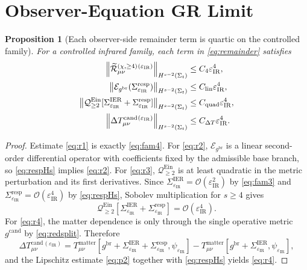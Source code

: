\documentclass[11pt]{article}
\newcommand{\ObserverMetric}{g^{\mathrm{br}}}
\newcommand{\CandidateMetric}{g^{\mathrm{cand}}}
\newcommand{\BaseShift}{\Sigma^{\mathrm{IER}}}
\newcommand{\ResponseShift}{\Sigma^{\mathrm{resp}}}
\newcommand{\EinLin}{\mathcal E_{\ObserverMetric}}
\newcommand{\EinQuad}{\mathcal Q_{\ge 2}^{\mathrm{Ein}}}
\newcommand{\RemLongFour}{\widetilde{\mathcal R}_{\mu\nu}^{(\chi,\ge 4)}}
\newcommand{\DeltaTCand}{\Delta T_{\mu\nu}^{\mathrm{cand}}}
\newcommand{\IRsmall}{\varepsilon_{\mathrm{IR}}}
\newtheorem{proposition}{Proposition}
\begin{document}
\section{Observer-Equation GR Limit}

\begin{proposition}[Each observer-side remainder term is quartic on the controlled family]
\label{prop:quartic}
For a controlled infrared family, each term in \eqref{eq:remainder} satisfies
\begin{align}
\norm{\RemLongFour{}^{(\IRsmall)}}_{H^{s-2}(\Sigma_t)}
&\le
C_4\IRsmall^4,
\label{eq:r1}
\\
\norm{\EinLin(\ResponseShift_{\IRsmall})}_{H^{s-2}(\Sigma_t)}
&\le
C_{\mathrm{lin}}\IRsmall^4,
\label{eq:r2}
\\
\norm{\EinQuad[\BaseShift_{\IRsmall}+\ResponseShift_{\IRsmall}]}_{H^{s-2}(\Sigma_t)}
&\le
C_{\mathrm{quad}}\IRsmall^4,
\label{eq:r3}
\\
\norm{\DeltaTCand{}^{(\IRsmall)}}_{H^{s-2}(\Sigma_t)}
&\le
C_{\Delta T}\IRsmall^4.
\label{eq:r4}
\end{align}
\end{proposition}

\begin{proof}
Estimate \eqref{eq:r1} is exactly \eqref{eq:fam4}. For \eqref{eq:r2}, \(\EinLin\) is a linear second-order differential operator with coefficients fixed by the admissible base branch, so \eqref{eq:respHs} implies \eqref{eq:r2}. For \eqref{eq:r3}, \(\EinQuad\) is at least quadratic in the metric perturbation and its first derivatives. Since \(\BaseShift_{\IRsmall}=\mathcal O(\IRsmall^2)\) by \eqref{eq:fam3} and \(\ResponseShift_{\IRsmall}=\mathcal O(\IRsmall^4)\) by \eqref{eq:respHs}, Sobolev multiplication for \(s\ge4\) gives
\[
\EinQuad[\BaseShift_{\IRsmall}+\ResponseShift_{\IRsmall}]
=
\mathcal O(\IRsmall^4).
\]
For \eqref{eq:r4}, the matter dependence is only through the single operative metric \(\CandidateMetric\) by \eqref{eq:redsplit}. Therefore
\[
\DeltaTCand{}^{(\IRsmall)}
=
T_{\mu\nu}^{\mathrm{matter}}[\ObserverMetric+\BaseShift_{\IRsmall}+\ResponseShift_{\IRsmall},\psi_{\IRsmall}]
-
T_{\mu\nu}^{\mathrm{matter}}[\ObserverMetric+\BaseShift_{\IRsmall},\psi_{\IRsmall}],
\]
and the Lipschitz estimate \eqref{eq:p2} together with \eqref{eq:respHs} yields \eqref{eq:r4}.
\end{proof}
\end{document}

